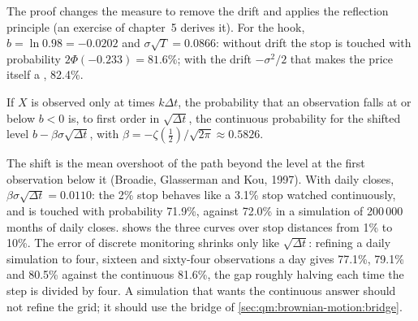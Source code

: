 \admitted

The proof changes the measure to remove the drift and applies the reflection principle
(an exercise of chapter~5 derives it). For the hook,
$b = \ln 0.98 = -0.0202$ and $\sigma\sqrt T = 0.0866$: without drift the stop is touched with
probability $2\Phi(-0.233) = 81.6\%$; with the drift $-\sigma^2/2$ that makes the price itself
a , 82.4\%.

\begin{proposition}\label{prop:qm:brownian-motion:bgk}
If $X$ is observed only at times $k\Delta t$, the probability that an observation falls at or
below $b < 0$ is, to first order in $\sqrt{\Delta t}$, the continuous probability for the
shifted level $b - \beta\sigma\sqrt{\Delta t}$, with $\beta = -\zeta(\tfrac12)/\sqrt{2\pi} \approx
0.5826$.
\end{proposition}

\admitted

The shift is the mean overshoot of the path beyond the level at the first observation below
it (Broadie, Glasserman and Kou, 1997). With daily closes, $\beta\sigma\sqrt{\Delta t} =
0.0110$: the 2\% stop behaves like a 3.1\% stop watched continuously, and is touched with
probability 71.9\%, against 72.0\% in a simulation of 200\,000 months of daily closes.
 shows the three curves over stop distances from 1\% to
10\%. The error of discrete monitoring shrinks only like $\sqrt{\Delta t}$: refining a daily
simulation to four, sixteen and sixty-four observations a day gives 77.1\%, 79.1\% and 80.5\%
against the continuous 81.6\%, the gap roughly halving each time the step is divided by
four. A simulation that wants the continuous answer should not refine the grid; it should use
the bridge of \cref{sec:qm:brownian-motion:bridge}.

